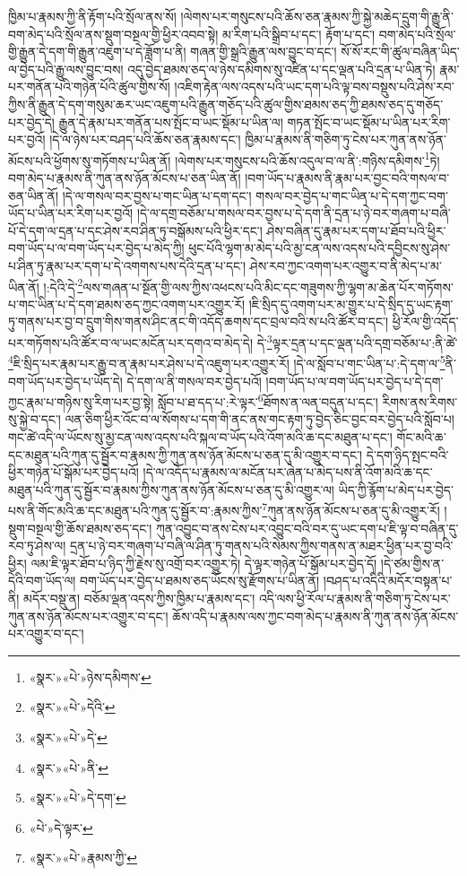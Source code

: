 ཁྱིམ་པ་རྣམས་ཀྱི་ནི་རྟོག་པའི་སྲོལ་ནས་སོ། །ལེགས་པར་གསུངས་པའི་ཆོས་ཅན་རྣམས་ཀྱི་སྐྱེ་མཆེད་དྲུག་གི་རྒྱུ་ནི་བག་མེད་པའི་སྲོལ་ནས་སྡུག་བསྔལ་གྱི་ཕྱིར་འབབ་སྟེ། མ་རིག་པའི་སྒྲིབ་པ་དང་། རྟོག་པ་དང་། བག་མེད་པའི་སྲོལ་གྱི་རྒྱུན་དེ་དག་གི་རྒྱུན་འཇུག་པ་དེ་ཟློག་པ་ནི། གཞན་གྱི་སྒྲའི་རྒྱུན་ལས་བྱུང་བ་དང་། སོ་སོ་རང་གི་ཚུལ་བཞིན་ཡིད་ལ་བྱེད་པའི་རྒྱུ་ལས་བྱུང་བས། འདུ་བྱེད་ཐམས་ཅད་ལ་ཉེས་དམིགས་སུ་འཛིན་པ་དང་ལྡན་པའི་དྲན་པ་ཡིན་ཏེ། རྣམ་པར་གནོན་པའི་གཉེན་པོའི་ཚུལ་གྱིས་སོ། །འཇིག་རྟེན་ལས་འདས་པའི་ཡང་དག་པའི་ལྟ་བས་བསྡུས་པའི་ཤེས་རབ་ཀྱིས་ནི་རྒྱུན་དེ་དག་གསུམ་ཆར་ཡང་འཇུག་པའི་རྒྱུན་གཅོད་པའི་ཚུལ་གྱིས་ཐམས་ཅད་ཀྱི་ཐམས་ཅད་དུ་གཅོད་པར་བྱེད་དེ། རྒྱུན་དེ་རྣམ་པར་གནོན་པས་སྤོང་བ་ཡང་སྡོམ་པ་ཡིན་ལ། གཏན་སྤོང་བ་ཡང་སྡོམ་པ་ཡིན་པར་རིག་པར་བྱའོ། །དེ་ལ་ཉེས་པར་བཤད་པའི་ཆོས་ཅན་རྣམས་དང་། ཁྱིམ་པ་རྣམས་ནི་གཅིག་ཏུ་ངེས་པར་ཀུན་ནས་ཉོན་མོངས་པའི་ཕྱོགས་སུ་གཏོགས་པ་ཡིན་ནོ། །ལེགས་པར་གསུངས་པའི་ཆོས་འདུལ་བ་ལ་ནི་:གཉིས་དམིགས་\footnote{«སྣར་»«པེ་»ཉེས་དམིགས་}ཏེ། བག་མེད་པ་རྣམས་ནི་ཀུན་ནས་ཉོན་མོངས་པ་ཅན་ཡིན་ནོ། །བག་ཡོད་པ་རྣམས་ནི་རྣམ་པར་བྱང་བའི་གསལ་བ་ཅན་ཡིན་ནོ། །དེ་ལ་གསལ་བར་བྱས་པ་གང་ཡིན་པ་དག་དང་། གསལ་བར་བྱེད་པ་གང་ཡིན་པ་དེ་དག་ཀྱང་བག་ཡོད་པ་ཡིན་པར་རིག་པར་བྱའོ། །དེ་ལ་དགྲ་བཅོམ་པ་གསལ་བར་བྱས་པ་དེ་དག་ནི་དྲན་པ་ཉེ་བར་གཞག་པ་བཞི་པོ་དེ་དག་ལ་དྲན་པ་དང་ཤེས་རབ་ཤིན་ཏུ་བསྒོམས་པའི་ཕྱིར་དང་། ཤེས་བཞིན་དུ་རྣམ་པར་དག་པ་ཐོབ་པའི་ཕྱིར་བག་ཡོད་པ་ལ་བག་ཡོད་པར་བྱེད་པ་མེད་ཀྱི། ཕུང་པོའི་ལྷག་མ་མེད་པའི་མྱ་ངན་ལས་འདས་པའི་དབྱིངས་སུ་ཤེས་པ་ཤིན་ཏུ་རྣམ་པར་དག་པ་དེ་འགགས་པས་དེའི་དྲན་པ་དང་། ཤེས་རབ་ཀྱང་འགག་པར་འགྱུར་བ་ནི་མེད་པ་མ་ཡིན་ནོ། །:དེའི་དེ་\footnote{«སྣར་»«པེ་»དེའི་}ལས་གཞན་པ་སྔོན་གྱི་ལས་ཀྱིས་འཕངས་པའི་མིང་དང་གཟུགས་ཀྱི་ལྷག་མ་ཆེན་པོར་གཏོགས་པ་གང་ཡིན་པ་དེ་དག་ཐམས་ཅད་ཀྱང་འགག་པར་འགྱུར་རོ། །ཇི་སྲིད་དུ་འགག་པར་མ་གྱུར་པ་དེ་སྲིད་དུ་ཡང་རྟག་ཏུ་གནས་པར་བྱ་བ་དྲུག་གིས་གནས་ཤིང་ནང་གི་འདོད་ཆགས་དང་བྲལ་བའི་ས་པའི་ཚོར་བ་དང་། ཕྱི་རོལ་གྱི་འདོད་པར་གཏོགས་པའི་ཚོར་བ་ལ་ཡང་མངོན་པར་དགའ་བ་མེད་དེ། དེ་\footnote{«སྣར་»«པེ་»དེ་}ལྟར་དྲན་པ་དང་ལྡན་པའི་དགྲ་བཅོམ་པ་:ནི་ཚེ་\footnote{«སྣར་»«པེ་»ནི་}ཇི་སྲིད་པར་རྣམ་པར་རྒྱུ་བ་ན་རྣམ་པར་ཤེས་པ་དེ་འཇུག་པར་འགྱུར་རོ། །དེ་ལ་སློབ་པ་གང་ཡིན་པ་:དེ་དག་ལ་\footnote{«སྣར་»«པེ་»དེ་དག་}ནི་བག་ཡོད་པར་བྱེད་པ་ཡོད་དེ། དེ་དག་ལ་ནི་གསལ་བར་བྱེད་པའོ། །བག་ཡོད་པ་ལ་བག་ཡོད་པར་བྱེད་པ་དེ་དག་ཀྱང་རྣམ་པ་གཉིས་སུ་རིག་པར་བྱ་སྟེ། སློབ་པ་ཐ་དད་པ་:རེ་ལྟར་\footnote{«པེ་»དེ་ལྟར་}ཐོགས་ན་ལན་བདུན་པ་དང་། རིགས་ནས་རིགས་སུ་སྐྱེ་བ་དང་། ལན་ཅིག་ཕྱིར་འོང་བ་ལ་སོགས་པ་དག་གི་ནང་ནས་གང་རྟག་ཏུ་བྱེད་ཅིང་བྱང་བར་བྱེད་པའི་སློབ་པ། གང་ཚེ་འདི་ལ་ཡོངས་སུ་མྱ་ངན་ལས་འདས་པའི་སྐལ་བ་ཡོད་པའི་འོག་མའི་ཆ་དང་མཐུན་པ་དང་། གོང་མའི་ཆ་དང་མཐུན་པའི་ཀུན་དུ་སྦྱོར་བ་རྣམས་ཀྱི་ཀུན་ནས་ཉོན་མོངས་པ་ཅན་དུ་མི་འགྱུར་བ་དང་། དེ་དག་ཉིད་སྤང་བའི་ཕྱིར་གཉེན་པོ་སྒོམ་པར་བྱེད་པའོ། །དེ་ལ་འདོད་པ་རྣམས་ལ་མངོན་པར་ཞེན་པ་མེད་པས་ནི་འོག་མའི་ཆ་དང་མཐུན་པའི་ཀུན་དུ་སྦྱོར་བ་རྣམས་ཀྱིས་ཀུན་ནས་ཉོན་མོངས་པ་ཅན་དུ་མི་འགྱུར་ལ། ཡིད་ཀྱི་རྙོག་པ་མེད་པར་བྱེད་པས་ནི་གོང་མའི་ཆ་དང་མཐུན་པའི་ཀུན་དུ་སྦྱོར་བ་:རྣམས་ཀྱིས་\footnote{«སྣར་»«པེ་»རྣམས་ཀྱི་}ཀུན་ནས་ཉོན་མོངས་པ་ཅན་དུ་མི་འགྱུར་རོ། །སྡུག་བསྔལ་གྱི་ཆོས་ཐམས་ཅད་དང་། ཀུན་འབྱུང་བ་ནས་ངེས་པར་འབྱུང་བའི་བར་དུ་ཡང་དག་པ་ཇི་ལྟ་བ་བཞིན་དུ་རབ་ཏུ་ཤེས་ལ། དྲན་པ་ཉེ་བར་གཞག་པ་བཞི་ལ་ཤིན་ཏུ་གནས་པའི་སེམས་ཀྱིས་གནས་ན་མཐར་ཕྱིན་པར་བྱ་བའི་ཕྱིར། ལམ་ཇི་ལྟར་ཐོབ་པ་ཉིད་ཀྱི་རྗེས་སུ་འགྲོ་བར་འགྱུར་ཏེ། དེ་ལྟར་གཉེན་པོ་སྒོམ་པར་བྱེད་དོ། །དེ་ཙམ་གྱིས་ན་དེའི་བག་ཡོད་ལ། བག་ཡོད་པར་བྱེད་པ་ཐམས་ཅད་ཡོངས་སུ་རྫོགས་པ་ཡིན་ནོ། །བཤད་པ་འདིའི་མདོར་བསྟན་པ་ནི། མདོར་བསྡུ་ན། བཅོམ་ལྡན་འདས་ཀྱིས་ཁྱིམ་པ་རྣམས་དང་། འདི་ལས་ཕྱི་རོལ་པ་རྣམས་ནི་གཅིག་ཏུ་ངེས་པར་ཀུན་ནས་ཉོན་མོངས་པར་འགྱུར་བ་དང་། ཆོས་འདི་པ་རྣམས་ལས་ཀྱང་བག་མེད་པ་རྣམས་ནི་ཀུན་ནས་ཉོན་མོངས་པར་འགྱུར་བ་དང་། 